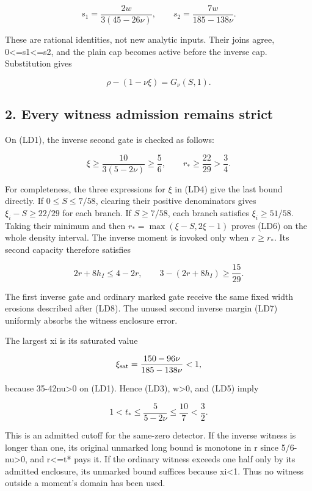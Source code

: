 \[
 s_1=\frac{2w}{3(45-26\nu)},\qquad
 s_2=\frac{7w}{185-138\nu}.                         \tag{LD4}
\]

These are rational identities, not new analytic inputs. Their joins agree, 0\textless=s1\textless=s2, and the plain cap becomes active before the inverse cap. Substitution gives

\[
 \rho-(1-\nu\xi)=G_\nu(S,1).                         \tag{LD5}
\]

\hypertarget{sources:every-witness-admission-remains-strict}{%
\subsection{2. Every witness admission remains strict}\label{sources:every-witness-admission-remains-strict}}

On (LD1), the inverse second gate is checked as follows:

\[
 \xi\ge\frac{10}{3(5-2\nu)}\ge\frac56,
 \qquad r_*\ge\frac{22}{29}>\frac34.              \tag{LD6}
\]

For completeness, the three expressions for \(\xi\) in (LD4)
give the last bound directly. If \(0\le S\le7/58\), clearing their
positive denominators gives \(\xi_i-S\ge22/29\) for each branch.
If \(S\ge7/58\), each branch satisfies \(\xi_i\ge51/58\).
Taking their minimum and then
\(r_*=\max(\xi-S,2\xi-1)\) proves (LD6) on the whole density interval.
The inverse moment is invoked only when \(r\ge r_*\). Its second
capacity therefore satisfies

\[
 2r+8h_I\le4-2r,\qquad
 3-(2r+8h_I)\ge\frac{15}{29}.                     \tag{LD7}
\]

The first inverse gate and ordinary marked gate receive the same fixed width erosions described after (LD8). The unused second inverse margin (LD7) uniformly absorbs the witness enclosure error.

The largest xi is its saturated value

\[
 \xi_{\rm sat}=\frac{150-96\nu}{185-138\nu}<1,
\]

because 35-42nu\textgreater0 on (LD1). Hence (LD3), w\textgreater0, and (LD5) imply

\[
                   1<t_*\le\frac5{5-2\nu}\le\frac{10}{7}<\frac32.
                                                               \tag{LD8}
\]

This is an admitted cutoff for the same-zero detector. If the inverse witness is longer than one, its original unmarked long bound is monotone in r since 5/6-nu\textgreater0, and r\textless=t* pays it. If the ordinary witness exceeds one half only by its admitted enclosure, its unmarked bound suffices because xi\textless1. Thus no witness outside a moment's domain has been used.

